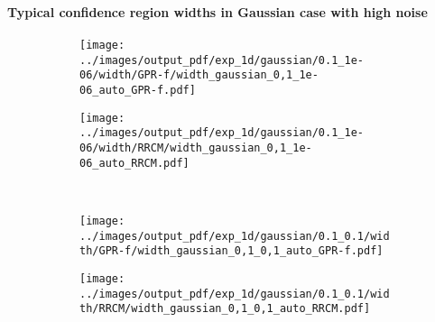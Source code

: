 \documentclass[t]{beamer}  %
\begin{document}
\begin{frame}[t]\frametitle{\insertsection}
  \framesubtitle{Typical confidence region widths in Gaussian case with high noise}
  \begin{figure}
    \centering
    \begin{subfigure}[b]{0.45\linewidth}
      \texttt{[image: ../images/output\_pdf/exp\_1d/gaussian/0.1\_1e-06/width/GPR-f/width\_gaussian\_0,1\_1e-06\_auto\_GPR-f.pdf]}
    \end{subfigure}%
    \begin{subfigure}[b]{0.45\linewidth}
      \texttt{[image: ../images/output\_pdf/exp\_1d/gaussian/0.1\_1e-06/width/RRCM/width\_gaussian\_0,1\_1e-06\_auto\_RRCM.pdf]}
    \end{subfigure}\\
    \begin{subfigure}[b]{0.45\linewidth}
      \texttt{[image: ../images/output\_pdf/exp\_1d/gaussian/0.1\_0.1/width/GPR-f/width\_gaussian\_0,1\_0,1\_auto\_GPR-f.pdf]}
    \end{subfigure}%
    \begin{subfigure}[b]{0.45\linewidth}
      \texttt{[image: ../images/output\_pdf/exp\_1d/gaussian/0.1\_0.1/width/RRCM/width\_gaussian\_0,1\_0,1\_auto\_RRCM.pdf]}
    \end{subfigure}\\
    \label{fig:gaussian_1d_high_noise_width}
  \end{figure}
\end{frame}
\end{document}
